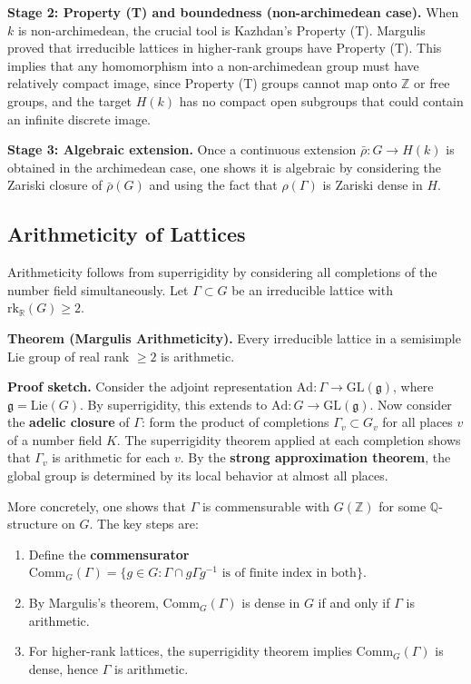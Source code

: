 \textbf{Stage 2: Property (T) and boundedness (non-archimedean case).}
When $k$ is non-archimedean, the crucial tool is Kazhdan's Property
(T). Margulis proved that irreducible lattices in higher-rank groups
have Property (T). This implies that any homomorphism into a
non-archimedean group must have relatively compact image, since
Property (T) groups cannot map onto $\mathbb{Z}$ or free groups, and
the target $H(k)$ has no compact open subgroups that could contain an
infinite discrete image.

\textbf{Stage 3: Algebraic extension.}
Once a continuous extension $\bar{\rho}: G \to H(k)$ is obtained in
the archimedean case, one shows it is algebraic by considering the
Zariski closure of $\bar{\rho}(G)$ and using the fact that $\rho(\Gamma)$
is Zariski dense in $H$.

\subsection{Arithmeticity of Lattices}

Arithmeticity follows from superrigidity by considering all completions
of the number field simultaneously. Let $\Gamma \subset G$ be an
irreducible lattice with $\mathrm{rk}_{\mathbb{R}}(G) \geq 2$.

\textbf{Theorem (Margulis Arithmeticity).} Every irreducible lattice in
a semisimple Lie group of real rank $\geq 2$ is arithmetic.

\textbf{Proof sketch.} Consider the adjoint representation
$\mathrm{Ad}: \Gamma \to \mathrm{GL}(\mathfrak{g})$, where
$\mathfrak{g} = \mathrm{Lie}(G)$. By superrigidity, this extends to
$\mathrm{Ad}: G \to \mathrm{GL}(\mathfrak{g})$. Now consider the
\textbf{adelic closure} of $\Gamma$: form the product of completions
$\Gamma_v \subset G_v$ for all places $v$ of a number field $K$. The
superrigidity theorem applied at each completion shows that $\Gamma_v$
is arithmetic for each $v$. By the \textbf{strong approximation
theorem}, the global group is determined by its local behavior at
almost all places.

More concretely, one shows that $\Gamma$ is commensurable with
$G(\mathbb{Z})$ for some $\mathbb{Q}$-structure on $G$. The key steps
are:
\begin{enumerate}
\item Define the \textbf{commensurator} $\mathrm{Comm}_G(\Gamma) =
\{g \in G : \Gamma \cap g\Gamma g^{-1} \text{ is of finite index in
both}\}$.
\item By Margulis's theorem, $\mathrm{Comm}_G(\Gamma)$ is dense in $G$
if and only if $\Gamma$ is arithmetic.
\item For higher-rank lattices, the superrigidity theorem implies
$\mathrm{Comm}_G(\Gamma)$ is dense, hence $\Gamma$ is arithmetic.
\end{enumerate}

